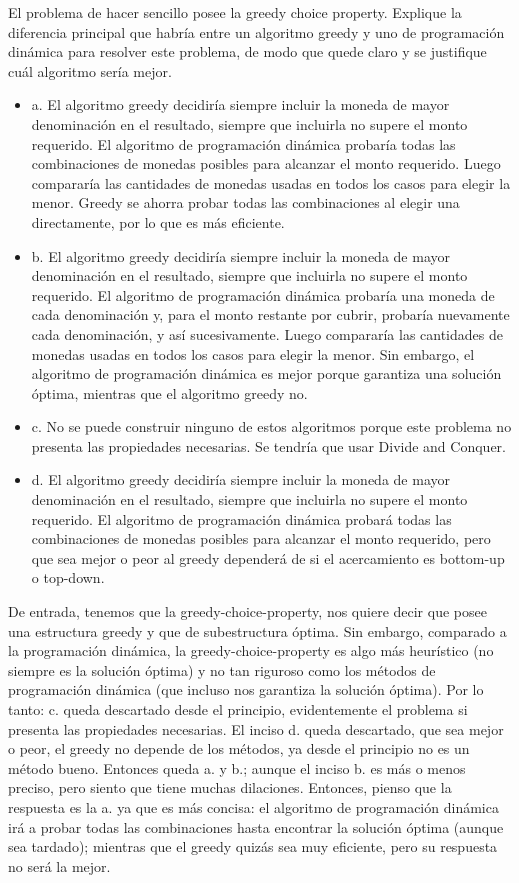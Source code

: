 \begin{problema}
    El problema de hacer sencillo posee la greedy choice property. Explique la diferencia principal que habría entre un algoritmo greedy y uno de programación dinámica para resolver este problema, de modo que quede claro y se justifique cuál algoritmo sería mejor.
    \begin{itemize}
        \item a. El algoritmo greedy decidiría siempre incluir la moneda de mayor denominación en el resultado, siempre que incluirla no supere el monto requerido. El algoritmo de programación dinámica probaría todas las combinaciones de monedas posibles para alcanzar el monto requerido. Luego compararía las cantidades de monedas usadas en todos los casos para elegir la menor. Greedy se ahorra probar todas las combinaciones al elegir una directamente, por lo que es más eficiente.
        \item b. El algoritmo greedy decidiría siempre incluir la moneda de mayor denominación en el resultado, siempre que incluirla no supere el monto requerido. El algoritmo de programación dinámica probaría una moneda de cada denominación y, para el monto restante por cubrir, probaría nuevamente cada denominación, y así sucesivamente. Luego compararía las cantidades de monedas usadas en todos los casos para elegir la menor. Sin embargo, el algoritmo de programación dinámica es mejor porque garantiza una solución óptima, mientras que el algoritmo greedy no.
        \item c. No se puede construir ninguno de estos algoritmos porque este problema no presenta las propiedades necesarias. Se tendría que usar Divide and Conquer.
        \item d. El algoritmo greedy decidiría siempre incluir la moneda de mayor denominación en el resultado, siempre que incluirla no supere el monto requerido. El algoritmo de programación dinámica probará todas las combinaciones de monedas posibles para alcanzar el monto requerido, pero que sea mejor o peor al greedy dependerá de si el acercamiento es bottom-up o top-down.
    \end{itemize}
    \begin{sol}
        De entrada, tenemos que la greedy-choice-property, nos quiere decir que posee una estructura greedy y que de subestructura óptima. Sin embargo, comparado a la programación dinámica, la greedy-choice-property es algo más heurístico (no siempre es la solución óptima) y no tan riguroso como los métodos de programación dinámica (que incluso nos garantiza la solución óptima). Por lo tanto: c. queda descartado desde el principio, evidentemente el problema si presenta las propiedades necesarias. El inciso d. queda descartado, que sea mejor o peor, el greedy no depende de los métodos, ya desde el principio no es un método bueno. Entonces queda a. y b.; aunque el inciso b. es más o menos preciso, pero siento que tiene muchas dilaciones. Entonces, pienso que la respuesta es la a. ya que es más concisa: el algoritmo de programación dinámica irá a probar todas las combinaciones hasta encontrar la solución óptima (aunque sea tardado); mientras que el greedy quizás sea muy eficiente, pero su respuesta no será la mejor. 

\end{sol}
\end{problema}
